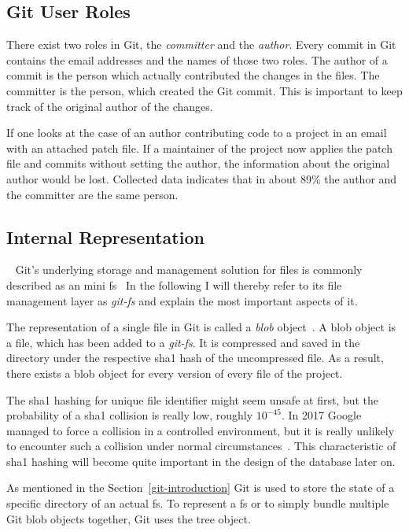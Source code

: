 \subsection{Git User Roles}
There exist two roles in Git, the \emph{committer} and the \emph{author}.
Every commit in Git contains the email addresses and the names of those two roles.
The author of a commit is the person which actually contributed the changes in the files.
The committer is the person, which created the Git commit.
This is important to keep track of the original author of the changes.

If one looks at the case of an author contributing code to a project in an email with an attached patch file.
If a maintainer of the project now applies the patch file and commits without setting the author, the information about the original author would be lost.
Collected data indicates that in about 89\% the author and the committer are the same person.


\subsection{Internal Representation}~\label{git-internal-representation}
Git's underlying storage and management solution for files is commonly described as an mini \ac{fs}~\cite[p.~9]{book:pro-git}
In the following I will thereby refer to its file management layer as \emph{git-fs} and explain the most important aspects of it.

The representation of a single file in Git is called a \emph{blob} object~\cite[p.~56]{book:pro-git}.
A blob object is a file, which has been added to a \emph{git-fs}.
It is compressed and saved in the  directory under the respective \ac{sha1} hash of the uncompressed file.
As a result, there exists a blob object for every version of every file of the project.

The \ac{sha1} hashing for unique file identifier might seem unsafe at first, but the probability of a \ac{sha1} collision is really low, roughly $10^{-45}$.
In 2017 Google managed to force a collision in a controlled environment, but it is really unlikely to encounter such a collision under normal circumstances~\cite{techreport:sha-collision}.
This characteristic of \ac{sha1} hashing will become quite important in the design of the database later on.

As mentioned in the Section~\ref{git-introduction} Git is used to store the state of a specific directory of an actual \ac{fs}.
To represent a \ac{fs} or to simply bundle multiple Git blob objects together, Git uses the tree object.

